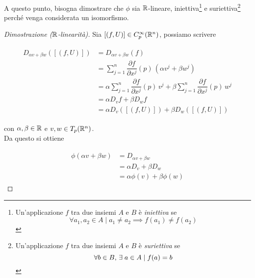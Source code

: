 A questo punto, bisogna dimostrare che $ \phi $ sia $ \mathbb{R} $-lineare, iniettiva\footnote{%
	Un'applicazione $ f $ tra due insiemi $ A $ e $ B $ è \textit{iniettiva} se
	\begin{equation}
		\forall a_{1},a_{2} \in A \mid a_{1} \neq a_{2} \implies f(a_{1}) \neq f(a_{2})
	\end{equation}%
} e suriettiva\footnote{%
	Un'applicazione $ f $ tra due insiemi $ A $ e $ B $ è \textit{suriettiva} se
	\begin{equation}
		\forall b \in B, \, \exists \; a \in A \mid f(a) = b
	\end{equation}%
} perché venga considerata un isomorfismo.

\begin{proof}[Dimostrazione ($ \mathbb{R} $-linearità)]
	Sia $ [(f,U)] \in C_{p}^{\infty}(\mathbb{R}^{n}) $, possiamo scrivere
	
	\begin{align}
		\begin{split}
			D_{\alpha v + \beta w} ([(f,U)]) &= D_{\alpha v + \beta w} (f)\\
			&= \sum_{j=1}^{n} \dfrac{\partial f}{\partial x^{j}} (p) \, (\alpha v^{j} + \beta w^{j})\\
			&= \alpha \sum_{j=1}^{n} \dfrac{\partial f}{\partial x^{j}} (p) \, v^{j} + \beta \sum_{j=1}^{n} \dfrac{\partial f}{\partial x^{j}} (p) \, w^{j}\\
			&= \alpha D_{v} f + \beta D_{w} f\\
			&= \alpha D_{v} ([(f,U)]) + \beta D_{w} ([(f,U)])
		\end{split}
	\end{align}

	con $ \alpha,\beta \in \mathbb{R} $ e $ v,w \in T_{p}(\mathbb{R}^{n}) $.\\
	Da questo si ottiene
	
	\begin{align}
		\begin{split}
			\phi (\alpha v + \beta w) &= D_{\alpha v + \beta w}\\
			&= \alpha D_{v} + \beta D_{w}\\
			&= \alpha \phi (v) + \beta \phi (w)
		\end{split}
	\end{align}
\end{proof}

